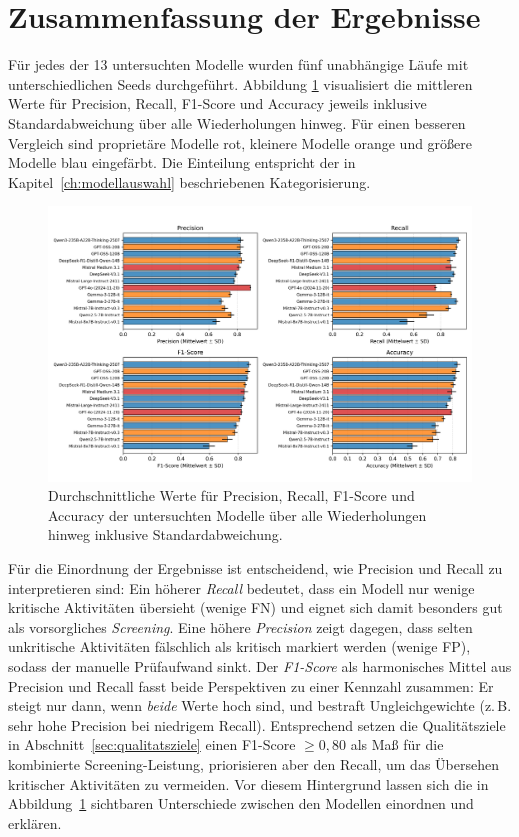 \section{Zusammenfassung der Ergebnisse}\label{sec:ueberblick}

Für jedes der 13 untersuchten Modelle wurden fünf unabhängige Läufe mit unterschiedlichen Seeds durchgeführt. Abbildung \ref{fig:results-evaluation-metrics-comparison} visualisiert die mittleren Werte für Precision, Recall, F1-Score und Accuracy jeweils inklusive Standardabweichung über alle Wiederholungen hinweg. Für einen besseren Vergleich sind proprietäre Modelle rot, kleinere Modelle orange und größere Modelle blau eingefärbt. Die Einteilung entspricht der in Kapitel~\ref{ch:modellauswahl} beschriebenen Kategorisierung.

\begin{figure}[h]
    \centering
    \includegraphics[width=\textwidth]{images/results/evaluation_metrics_comparison}
    \caption{Durchschnittliche Werte für Precision, Recall, F1-Score und Accuracy der untersuchten Modelle über alle Wiederholungen hinweg inklusive Standardabweichung.}
    \label{fig:results-evaluation-metrics-comparison}
\end{figure}

Für die Einordnung der Ergebnisse ist entscheidend, wie Precision und Recall zu interpretieren sind: Ein höherer \emph{Recall} bedeutet, dass ein Modell nur wenige kritische Aktivitäten übersieht (wenige \ac{FN}) und eignet sich damit besonders gut als vorsorgliches \emph{Screening}. Eine höhere \emph{Precision} zeigt dagegen, dass selten unkritische Aktivitäten fälschlich als kritisch markiert werden (wenige \ac{FP}), sodass der manuelle Prüfaufwand sinkt. Der \emph{F1-Score} als harmonisches Mittel aus Precision und Recall fasst beide Perspektiven zu einer Kennzahl zusammen: Er steigt nur dann, wenn \emph{beide} Werte hoch sind, und bestraft Ungleichgewichte (z.\,B. sehr hohe Precision bei niedrigem Recall). Entsprechend setzen die Qualitätsziele in Abschnitt~\ref{sec:qualitatsziele} einen F1-Score $\geq 0{,}80$ als Maß für die kombinierte Screening-Leistung, priorisieren aber den Recall, um das Übersehen kritischer Aktivitäten zu vermeiden. Vor diesem Hintergrund lassen sich die in Abbildung~\ref{fig:results-evaluation-metrics-comparison} sichtbaren Unterschiede zwischen den Modellen einordnen und erklären.

